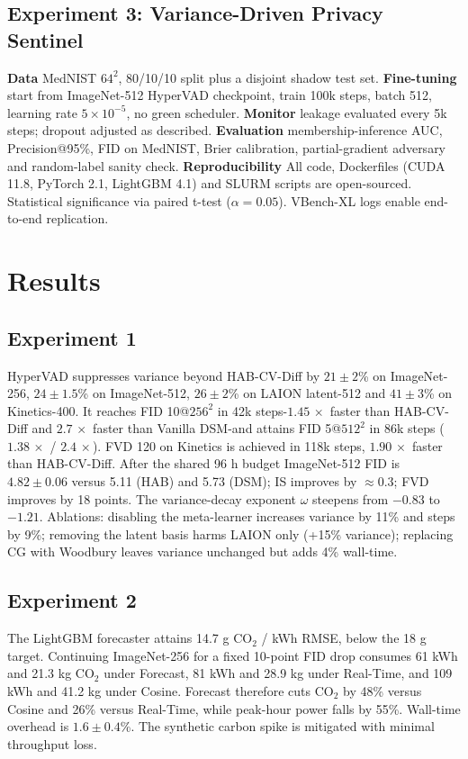 \documentclass{article}
\begin{document}
\subsection{Experiment 3: Variance-Driven Privacy Sentinel}
\textbf{Data} MedNIST $64^2$, 80/10/10 split plus a disjoint shadow test set. \textbf{Fine-tuning} start from ImageNet-512 HyperVAD checkpoint, train 100k steps, batch 512, learning rate $5\times 10^{-5}$, no green scheduler. \textbf{Monitor} leakage evaluated every 5k steps; dropout adjusted as described. \textbf{Evaluation} membership-inference AUC, Precision@95\%, FID on MedNIST, Brier calibration, partial-gradient adversary and random-label sanity check. \textbf{Reproducibility} All code, Dockerfiles (CUDA 11.8, PyTorch 2.1, LightGBM 4.1) and SLURM scripts are open-sourced. Statistical significance via paired t-test ($\alpha=0.05$). VBench-XL logs enable end-to-end replication.

\section{Results}
\subsection{Experiment 1}
HyperVAD suppresses variance beyond HAB-CV-Diff by $21 \pm 2$\% on ImageNet-256, $24 \pm 1.5$\% on ImageNet-512, $26 \pm 2$\% on LAION latent-512 and $41 \pm 3$\% on Kinetics-400. It reaches FID 10@${256^2}$ in 42k steps-$1.45\,\times$ faster than HAB-CV-Diff and $2.7\,\times$ faster than Vanilla DSM-and attains FID 5@${512^2}$ in 86k steps ($1.38\,\times$ / $2.4\,\times$). FVD 120 on Kinetics is achieved in 118k steps, $1.90\,\times$ faster than HAB-CV-Diff. After the shared 96 h budget ImageNet-512 FID is $4.82 \pm 0.06$ versus 5.11 (HAB) and 5.73 (DSM); IS improves by $\approx 0.3$; FVD improves by 18 points. The variance-decay exponent $\omega$ steepens from $-0.83$ to $-1.21$. Ablations: disabling the meta-learner increases variance by 11\% and steps by 9\%; removing the latent basis harms LAION only (+15\% variance); replacing CG with Woodbury leaves variance unchanged but adds 4\% wall-time.

\subsection{Experiment 2}
The LightGBM forecaster attains 14.7 g CO$_2$ / kWh RMSE, below the 18 g target. Continuing ImageNet-256 for a fixed 10-point FID drop consumes 61 kWh and 21.3 kg CO$_2$ under Forecast, 81 kWh and 28.9 kg under Real-Time, and 109 kWh and 41.2 kg under Cosine. Forecast therefore cuts CO$_2$ by 48\% versus Cosine and 26\% versus Real-Time, while peak-hour power falls by 55\%. Wall-time overhead is $1.6 \pm 0.4$\%. The synthetic carbon spike is mitigated with minimal throughput loss.
\end{document}
